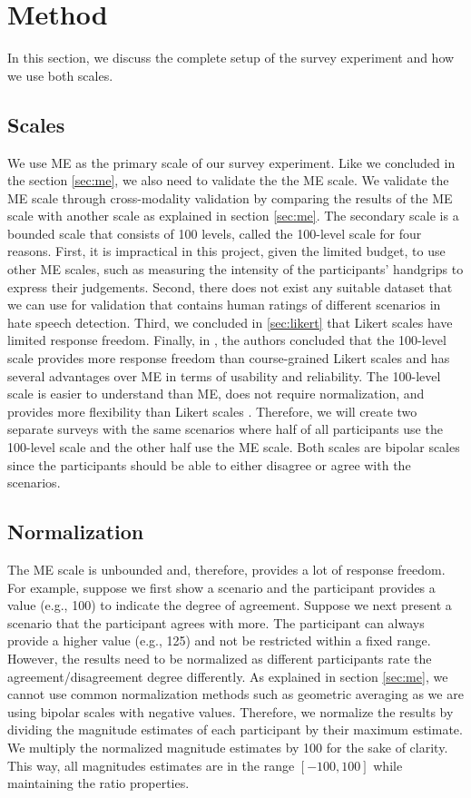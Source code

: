 \section{Method}
\label{sec:survey-method}
In this section, we discuss the complete setup of the survey experiment and how we use both scales.

\subsection{Scales}
We use ME as the primary scale of our survey experiment.
%
Like we concluded in the section \ref{sec:me}, we also need to validate the the ME scale.
%
We validate the ME scale through cross-modality validation by comparing the results of the ME scale with another scale as explained in section \ref{sec:me}.
%
The secondary scale is a bounded scale that consists of 100 levels, called the 100-level scale  for four reasons.
%
First, it is impractical in this project, given the limited budget, to use other ME scales, such as measuring the intensity of the participants' handgrips to express their judgements.
%
Second, there does not exist any suitable dataset that we can use for validation that contains human ratings of different scenarios in hate speech detection.
%
Third, we concluded in \ref{sec:likert} that Likert scales have limited response freedom.
%
Finally, in \cite{roitero2018fine}, the authors concluded that the 100-level scale provides more response freedom than course-grained Likert scales and has several advantages over ME in terms of usability and reliability.
%
The 100-level scale is easier to understand than ME, does not require normalization, and provides more flexibility than Likert scales \cite{roitero2018fine}.
%
Therefore, we will create two separate surveys with the same scenarios where half of all participants use the 100-level scale and the other half use the ME scale.
%
Both scales are bipolar scales since the participants should be able to either disagree or agree with the scenarios.

\subsection{Normalization}
The ME scale is unbounded and, therefore, provides a lot of response freedom.
%
For example, suppose we first show a scenario and the participant provides a value (e.g., 100) to indicate the degree of agreement.
%
Suppose we next present a scenario that the participant agrees with more.
%
The participant can always provide a higher value (e.g., 125) and not be restricted within a fixed range.
%
However, the results need to be normalized as different participants rate the agreement/disagreement degree differently.
%
As explained in section \ref{sec:me}, we cannot use common normalization methods such as geometric averaging as we are using bipolar scales with negative values.
%
Therefore, we normalize the results by dividing the magnitude estimates of each participant by their maximum estimate.
%
We multiply the normalized magnitude estimates by 100 for the sake of clarity.
%
This way, all magnitudes estimates are in the range $[-100, 100]$ while maintaining the ratio properties.

